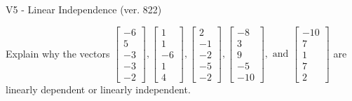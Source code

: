\begin{exercise}
  \begin{exerciseTitle}V5 - Linear Independence (ver. 822)\end{exerciseTitle}
  \begin{exerciseStatement}
    Explain why the vectors \(\left[\begin{array}{r}
-6 \\
5 \\
-3 \\
-3 \\
-2
\end{array}\right] , \left[\begin{array}{r}
1 \\
1 \\
-6 \\
1 \\
4
\end{array}\right] , \left[\begin{array}{r}
2 \\
-1 \\
-2 \\
-5 \\
-2
\end{array}\right] , \left[\begin{array}{r}
-8 \\
3 \\
9 \\
-5 \\
-10
\end{array}\right] , \text{ and } \left[\begin{array}{r}
-10 \\
7 \\
1 \\
7 \\
2
\end{array}\right]\) are linearly dependent or linearly independent.	



\end{exerciseStatement}
\end{exercise}
